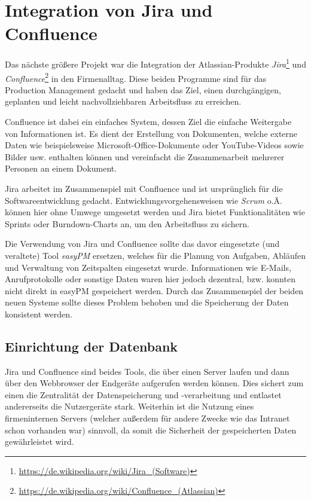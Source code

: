 \documentclass[xcolor=dvipsnames,11pt,paper=a4paper]{report}
\begin{document}
\chapter{Integration von Jira und Confluence}
\label{ch:jira}

Das nächste größere Projekt war die Integration der Atlassian-Produkte \textit{Jira}\footnote{\url{https://de.wikipedia.org/wiki/Jira_(Software)}}
und \textit{Confluence}\footnote{\url{https://de.wikipedia.org/wiki/Confluence_(Atlassian)}} in den Firmenalltag. Diese beiden Programme sind für das
Production Management gedacht und haben das Ziel, einen durchgängigen, geplanten
und leicht nachvollziehbaren Arbeitsfluss zu erreichen.

Confluence ist dabei ein einfaches System, dessen Ziel die einfache Weitergabe von
Informationen ist. Es dient der Erstellung von Dokumenten, welche externe Daten
wie beispielsweise Microsoft-Office-Dokumente oder YouTube-Videos sowie Bilder usw.
enthalten können und vereinfacht die Zusammenarbeit mehrerer Personen an einem Dokument.

Jira arbeitet im Zusammenspiel mit Confluence und ist ursprünglich für die Softwareentwicklung
gedacht. Entwicklungsvorgehensweisen wie \textit{Scrum} o.Ä. können hier ohne Umwege
umgesetzt werden und Jira bietet Funktionalitäten wie Sprints oder Burndown-Charts
an, um den Arbeitsfluss zu sichern.

Die Verwendung von Jira und Confluence sollte das davor eingesetzte (und veraltete)
Tool \textit{easyPM} ersetzen, welches für die Planung von Aufgaben, Abläufen und
Verwaltung von Zeitspalten eingesetzt wurde. Informationen wie E-Mails, Anrufprotokolle
oder sonstige Daten waren hier jedoch dezentral, bzw. konnten nicht direkt in easyPM
gespeichert werden. Durch das Zusammenspiel der beiden neuen Systeme sollte dieses
Problem behoben und die Speicherung der Daten konsistent werden.



\section{Einrichtung der Datenbank}
\label{sec:jira-einrichtung-datenbank}

Jira und Confluence sind beides Tools, die über einen Server laufen und dann über
den Webbrowser der Endgeräte aufgerufen werden können. Dies sichert zum einen die
Zentralität der Datenspeicherung und -verarbeitung und entlastet andererseits die
Nutzergeräte stark. Weiterhin ist die Nutzung eines firmeninternen Servers (welcher
außerdem für andere Zwecke wie das Intranet schon vorhanden war) sinnvoll, da somit
die Sicherheit der gespeicherten Daten gewährleistet wird.
\end{document}
